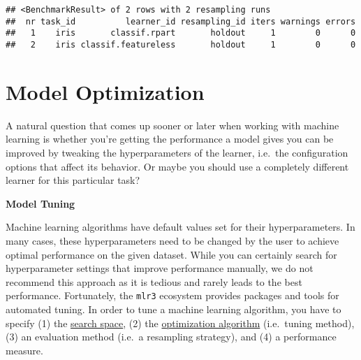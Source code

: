 \documentclass[
]{scrbook}
\newenvironment{Shaded}{\begin{snugshade}}{\end{snugshade}}
\newcommand{\CommentTok}[1]{\textcolor[rgb]{0.56,0.35,0.01}{\textit{#1}}}
\newcommand{\FunctionTok}[1]{\textcolor[rgb]{0.00,0.00,0.00}{#1}}
\newcommand{\NormalTok}[1]{#1}
\newcommand{\OtherTok}[1]{\textcolor[rgb]{0.56,0.35,0.01}{#1}}
\newcommand{\SpecialCharTok}[1]{\textcolor[rgb]{0.00,0.00,0.00}{#1}}
\newcommand{\StringTok}[1]{\textcolor[rgb]{0.31,0.60,0.02}{#1}}
\renewenvironment{Shaded} {\begin{snugshade}\small} {\end{snugshade}}
\begin{document}
\begin{Shaded}
\end{Shaded}

\begin{verbatim}
## <BenchmarkResult> of 2 rows with 2 resampling runs
##  nr task_id          learner_id resampling_id iters warnings errors
##   1    iris       classif.rpart       holdout     1        0      0
##   2    iris classif.featureless       holdout     1        0      0
\end{verbatim}

\hypertarget{optimization}{%
\chapter{Model Optimization}\label{optimization}}

A natural question that comes up sooner or later when working with machine learning is whether you're getting the performance a model gives you can be improved by tweaking the hyperparameters of the learner, i.e.~the configuration options that affect its behavior.
Or maybe you should use a completely different learner for this particular task?

\textbf{Model Tuning}

Machine learning algorithms have default values set for their hyperparameters.
In many cases, these hyperparameters need to be changed by the user to achieve optimal performance on the given dataset.
While you can certainly search for hyperparameter settings that improve performance manually, we do not recommend this approach as it is tedious and rarely leads to the best performance.
Fortunately, the \texttt{mlr3} ecosystem provides packages and tools for automated tuning.
In order to tune a machine learning algorithm, you have to specify (1) the \protect\hyperlink{tuning-optimization}{search space}, (2) the \protect\hyperlink{tuning-algorithms}{optimization algorithm} (i.e.~tuning method), (3) an evaluation method (i.e.~a resampling strategy), and (4) a performance measure.
\end{document}

